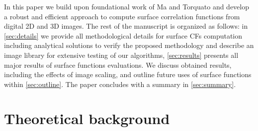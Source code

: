 \documentclass[reprint,amsmath,amssymb,aps,pre,showkeys,showpacs]{revtex4-1}
\begin{document}
In this paper we build upon foundational work of Ma and Torquato \cite{ma2018SS}
and develop a robust and efficient approach to compute surface correlation
functions from digital 2D and 3D images. The rest of the manuscript is organized
as follows: in \cref{sec:details} we provide all methodological details for
surface CFs computation including analytical solutions to verify the proposed
methodology and describe an image library for extensive testing of our
algorithms, \cref{sec:results} presents all major results of surface functions
evaluations. We discuss obtained results, including the effects of image
scaling, and outline future uses of surface functions within
\cref{sec:outline}. The paper concludes with a summary in \cref{sec:summary}.

\section{Theoretical background}
\label{sec:theory}
\end{document}
